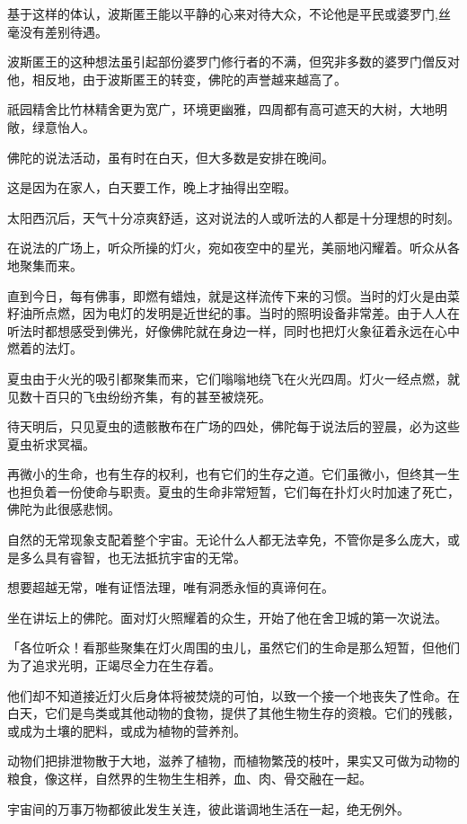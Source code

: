 \documentclass[twoside,openany]{book}
\begin{document}
基于这样的体认，波斯匿王能以平静的心来对待大众，不论他是平民或婆罗门,丝毫没有差别待遇。

波斯匿王的这种想法虽引起部份婆罗门修行者的不满，但究非多数的婆罗门僧反对他，相反地，由于波斯匿王的转变，佛陀的声誉越来越高了。

祇园精舍比竹林精舍更为宽广，环境更幽雅，四周都有高可遮天的大树，大地明敞，绿意怡人。

佛陀的说法活动，虽有时在白天，但大多数是安排在晚间。

这是因为在家人，白天要工作，晚上才抽得出空暇。

太阳西沉后，天气十分凉爽舒适，这对说法的人或听法的人都是十分理想的时刻。

在说法的广场上，听众所操的灯火，宛如夜空中的星光，美丽地闪耀着。听众从各地聚集而来。

直到今日，每有佛事，即燃有蜡烛，就是这样流传下来的习惯。当时的灯火是由菜籽油所点燃，因为电灯的发明是近世纪的事。当时的照明设备非常差。由于人人在听法时都想感受到佛光，好像佛陀就在身边一样，同时也把灯火象征着永远在心中燃着的法灯。

夏虫由于火光的吸引都聚集而来，它们嗡嗡地绕飞在火光四周。灯火一经点燃，就见数十百只的飞虫纷纷齐集，有的甚至被烧死。

待天明后，只见夏虫的遗骸散布在广场的四处，佛陀每于说法后的翌晨，必为这些夏虫祈求冥福。

再微小的生命，也有生存的权利，也有它们的生存之道。它们虽微小，但终其一生也担负着一份使命与职责。夏虫的生命非常短暂，它们每在扑灯火时加速了死亡，佛陀为此很感悲悯。

自然的无常现象支配着整个宇宙。无论什么人都无法幸免，不管你是多么庞大，或是多么具有睿智，也无法抵抗宇宙的无常。

想要超越无常，唯有证悟法理，唯有洞悉永恒的真谛何在。

坐在讲坛上的佛陀。面对灯火照耀着的众生，开始了他在舍卫城的第一次说法。

「各位听众！看那些聚集在灯火周围的虫儿，虽然它们的生命是那么短暂，但他们为了追求光明，正竭尽全力在生存着。

他们却不知道接近灯火后身体将被焚烧的可怕，以致一个接一个地丧失了性命。在白天，它们是鸟类或其他动物的食物，提供了其他生物生存的资粮。它们的残骸，或成为土壤的肥料，或成为植物的营养剂。

动物们把排泄物散于大地，滋养了植物，而植物繁茂的枝叶，果实又可做为动物的粮食，像这样，自然界的生物生生相养，血、肉、骨交融在一起。

宇宙间的万事万物都彼此发生关连，彼此谐调地生活在一起，绝无例外。
\end{document}
